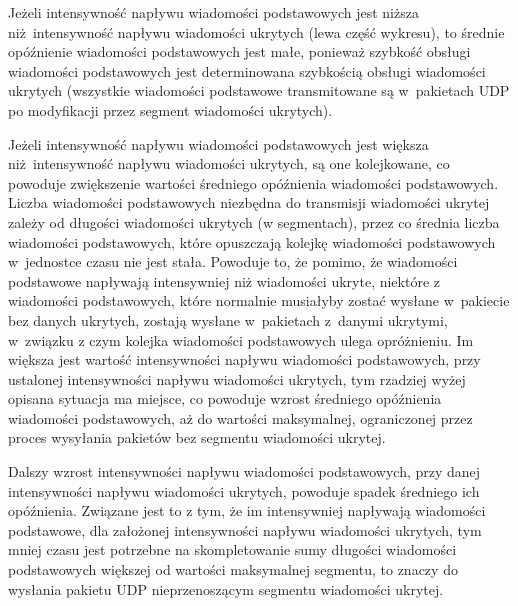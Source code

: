 \documentclass[a4paper, twoside, openright, 12pt]{report}
\begin{document}
            Jeżeli intensywność napływu wiadomości podstawowych
            jest niższa niż intensywność napływu wiadomości ukrytych (lewa część wykresu),
            to średnie opóźnienie wiadomości
            podstawowych jest małe, ponieważ szybkość obsługi wiadomości podstawowych jest
            determinowana szybkością obsługi wiadomości ukrytych (wszystkie wiadomości podstawowe transmitowane
            są w~pakietach UDP po modyfikacji przez segment wiadomości ukrytych).

            Jeżeli intensywność napływu wiadomości
            podstawowych jest większa niż intensywność napływu wiadomości ukrytych, są one kolejkowane,
            co powoduje zwiększenie wartości średniego opóźnienia wiadomości podstawowych.
            Liczba wiadomości podstawowych niezbędna do transmisji wiadomości ukrytej
            zależy od długości wiadomości ukrytych (w segmentach),
            przez co średnia liczba wiadomości podstawowych, które opuszczają kolejkę wiadomości
            podstawowych w~jednostce czasu nie jest stała. Powoduje to, że pomimo,
            że wiadomości podstawowe napływają intensywniej niż wiadomości ukryte,
            niektóre z wiadomości podstawowych, które normalnie musiałyby zostać
            wysłane w~pakiecie bez danych ukrytych, zostają wysłane w~pakietach
            z~danymi ukrytymi, w~związku z czym kolejka wiadomości podstawowych
            ulega opróżnieniu. Im większa jest wartość intensywności napływu wiadomości
            podstawowych, przy ustalonej intensywności napływu wiadomości ukrytych,
            tym rzadziej wyżej opisana sytuacja ma miejsce, co powoduje
            wzrost średniego opóźnienia wiadomości podstawowych, aż do wartości
            maksymalnej, ograniczonej przez proces wysyłania pakietów bez segmentu wiadomości ukrytej.

            Dalszy wzrost intensywności napływu wiadomości podstawowych, przy danej
            intensywności napływu wiadomości ukrytych, powoduje
            spadek średniego ich opóźnienia. Związane jest to z tym, że im intensywniej
            napływają wiadomości podstawowe, dla założonej intensywności napływu wiadomości
            ukrytych, tym mniej czasu jest potrzebne na skompletowanie sumy długości
            wiadomości podstawowych większej od wartości maksymalnej segmentu, to znaczy
            do wysłania pakietu UDP nieprzenoszącym segmentu wiadomości ukrytej.
\end{document}
